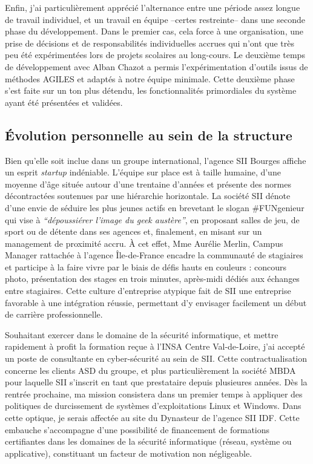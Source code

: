   Enfin, j'ai particulièrement apprécié l'alternance entre une période assez longue de travail individuel, et un travail en équipe --certes restreinte-- dans une seconde phase du développement. 
  Dans le premier cas, cela force à une organisation, une prise de décisions et de responsabilités individuelles accrues qui n'ont que très peu été expérimentées lors de projets scolaires au long-cours.
  Le deuxième temps de développement avec Alban Chazot a permis l'expérimentation d'outils issus de méthodes AGILES et adaptés à notre équipe minimale.  
  Cette deuxième phase s'est faite sur un ton plus détendu, les fonctionnalités primordiales du système ayant été présentées et validées. 
  
  \subsection{\'{E}volution personnelle au sein de la structure}
  
  Bien qu'elle soit inclue dans un groupe international, l'agence SII Bourges affiche un \og esprit \emph{startup}\fg{} indéniable. 
  L'équipe sur place est à taille humaine, d'une moyenne d'âge située autour d'une trentaine d'années et présente des normes décontractées soutenues par une hiérarchie horizontale.
  La société SII dénote d'une envie de séduire les plus jeunes actifs en brevetant le slogan \#FUNgenieur qui vise à \emph{``dépoussiérer l'image du geek austère''}, en proposant salles de jeu, de sport ou de détente dans ses agences et, 
  finalement, en misant sur un management de proximité accru.
  \`{A} cet effet, Mme Aurélie Merlin, Campus Manager rattachée à l'agence Île-de-France encadre la communauté de stagiaires et participe à la faire vivre par le biais de défis hauts en couleurs : concours photo, présentation 
  des stages en trois minutes, après-midi dédiés aux échanges entre stagiaires. 
  Cette culture d'entreprise atypique fait de SII une entreprise favorable à une intégration réussie, permettant d'y envisager facilement un début de carrière professionnelle. 
  
  Souhaitant exercer dans le domaine de la sécurité informatique, et mettre rapidement à profit la formation reçue à l'INSA Centre Val-de-Loire, j'ai accepté un poste de consultante en cyber-sécurité au sein de SII.
  Cette contractualisation concerne les clients \gls{ASD} du groupe, et plus particulièrement la société MBDA pour laquelle SII s'inscrit en tant que prestataire depuis plusieures années. 
  Dès la rentrée prochaine, ma mission consistera dans un premier temps à appliquer des politiques de durcissement de systèmes d'exploitations Linux et Windows. 
  Dans cette optique, je serais affectée au site du Dynasteur de l'agence SII \gls{IDF}. 
  Cette embauche s'accompagne d'une possibilité de financement de formations certifiantes dans les domaines de la sécurité informatique (réseau, système ou applicative), constituant un facteur de motivation non négligeable.  
  